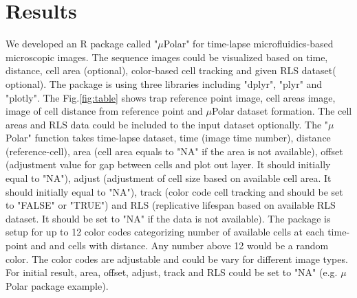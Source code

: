 \documentclass[conference]{IEEEtran}
\begin{document}
 


\section{Results}

We developed an R package called "$\mu$Polar" for time-lapse microfluidics-based microscopic images. The sequence images could be visualized based on time, distance, cell area (optional), color-based cell tracking and given RLS dataset( optional). The package is using three libraries including "dplyr", "plyr" and "plotly". The Fig.\ref{fig:table} shows trap reference point image, cell areas image, image of cell distance from reference point and $\mu$Polar dataset formation. The cell areas and RLS data could be included to the input dataset optionally. The "$\mu$Polar" function takes time-lapse dataset, time (image time number), distance (reference-cell), area (cell area equals to "NA" if the area is not available), offset (adjustment value for gap between cells and plot out layer. It should initially equal to "NA"), adjust (adjustment of cell size based on available cell area. It should initially equal to "NA"), track (color code cell tracking and should be set to "FALSE" or "TRUE") and RLS (replicative lifespan based on available RLS dataset. It should be set to "NA" if the data is not available). The package is setup for up to 12 color codes categorizing number of available cells at each time-point and and cells with distance. Any number above 12 would be a random color. The color codes are adjustable and could be vary for different image types. For initial result, area, offset, adjust, track and RLS could be set to "NA" (e.g. $\mu$Polar package example).  
\end{document}
